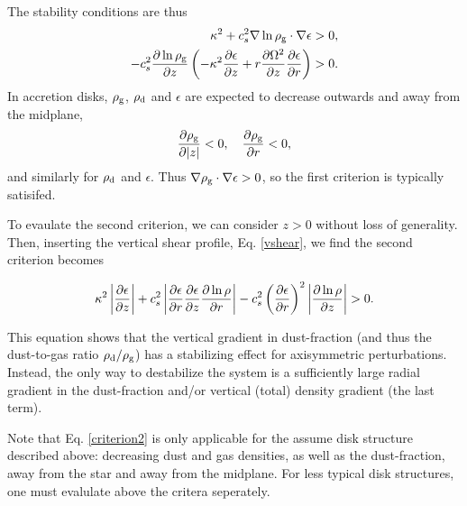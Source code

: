 
The stability conditions are thus
\begin{align}
  \kappa^2 + c_s^2 \nabla\ln{\rho_\mathrm{g}}\cdot\nabla\epsilon &> 0,  \\
  -c_s^2\frac{\partial\ln{\rho_\mathrm{g}}}{\partial z}\left(-\kappa^2\frac{\partial\epsilon}{\partial
    z} + r\frac{\partial\Omega^2}{\partial z}\frac{\partial \epsilon}{\partial r} \right) & > 0. 
\end{align}
In accretion disks, $\rho_\mathrm{g}$, $\rho_\mathrm{d}$ and $\epsilon$ are expected to
decrease outwards and away from the midplane, 
\begin{align*}  
  \frac{\partial\rho_\mathrm{g}}{\partial |z|} < 0, \quad \frac{\partial \rho_\mathrm{g}}{\partial r} < 0,   
\end{align*}
and similarly for $\rho_\mathrm{d}$ and $\epsilon$. Thus 
$\nabla\rho_\mathrm{g}\cdot\nabla\epsilon>0$, so the first criterion is
typically satisifed. 

To evaulate the second criterion, we can consider $z>0$ without loss
of generality. Then, inserting the vertical shear profile, 
Eq. \ref{vshear}, we find the second criterion becomes   

\begin{align} 
  \kappa^2\left|\frac{\partial\epsilon}{\partial z}\right| + c_s^2\left|\frac{\partial
    \epsilon}{\partial r}\frac{\partial\epsilon}{\partial z}\frac{\partial\ln{\rho}}{\partial
    r}\right| - c_s^2 \left(\frac{\partial\epsilon}{\partial
    r}\right)^2\left|\frac{\partial\ln{\rho}}{\partial z}\right| > 0.  \label{criterion2}
\end{align}

This equation shows that the vertical gradient in dust-fraction (and
thus the dust-to-gas ratio $\rho_\mathrm{d}/\rho_\mathrm{g}$) has a stabilizing effect for
axisymmetric perturbations. Instead, the only way to destabilize the
system is a sufficiently large radial gradient in the dust-fraction
and/or vertical (total) density gradient (the last term).  

Note that Eq. \ref{criterion2} is only applicable for the assume disk
structure described above: decreasing dust and gas densities, as well
as the dust-fraction, away from the star and away from the
midplane. For less typical disk structures, one must evalulate above the
critera seperately. 


